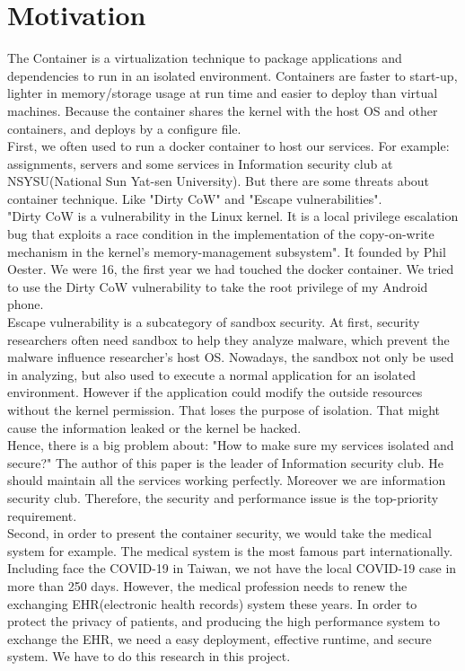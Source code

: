 \documentclass[12pt,a4paper]{IEEEconf}
\begin{document}
\section{Motivation}
The Container is a virtualization technique to package applications and dependencies to run in
an isolated environment. Containers are faster to start-up, lighter in memory/storage usage
at run time and easier to deploy than virtual machines. Because the container shares the
kernel with the host OS and other containers, and deploys by a configure file.\\
First, we often used to run a docker container to host our services. For example: assignments,
servers and some services in Information security club at NSYSU(National Sun Yat-sen University).
But there are some threats about container technique. Like "Dirty CoW\cite{Dirty_CoW}"
and "Escape vulnerabilities".\\
"Dirty CoW is a vulnerability in the Linux kernel. It is a local privilege escalation bug
that exploits a race condition in the implementation of the copy-on-write mechanism in the
kernel's memory-management subsystem"\cite{Dirty_CoW_wiki}. It founded by Phil Oester. We
were 16, the first year we had touched the docker container. We tried to use the Dirty CoW
vulnerability to take the root privilege of my Android phone.\\
Escape vulnerability is a subcategory of sandbox security. At first, security researchers often
need sandbox to help they analyze malware, which prevent the malware influence researcher's
host OS. Nowadays, the sandbox not only be used in analyzing, but also used to execute a
normal application for an isolated environment. However if the application could modify the
outside resources without the kernel permission. That loses the purpose of isolation. That
might cause the information leaked or the kernel be hacked.\\
Hence, there is a big problem about: "How to make sure my services isolated and secure?" The
author of this paper is the leader of Information security club. He should maintain all
the services working perfectly. Moreover we are information security club. Therefore,
the security and performance issue is the top-priority requirement.\\
Second, in order to present the container security, we would take the medical system for
example.
The medical system is the most famous part internationally. Including face the COVID-19
in Taiwan, we not have the local COVID-19 case in more than 250 days.\cite{COVID19_CNN}
However, the medical profession needs to renew the exchanging EHR(electronic health records)
system these years. In order to protect the privacy of patients, and producing the high
performance system to exchange the EHR, we need a easy deployment, effective runtime, and
secure system. We have to do this research in this project.
\end{document}
